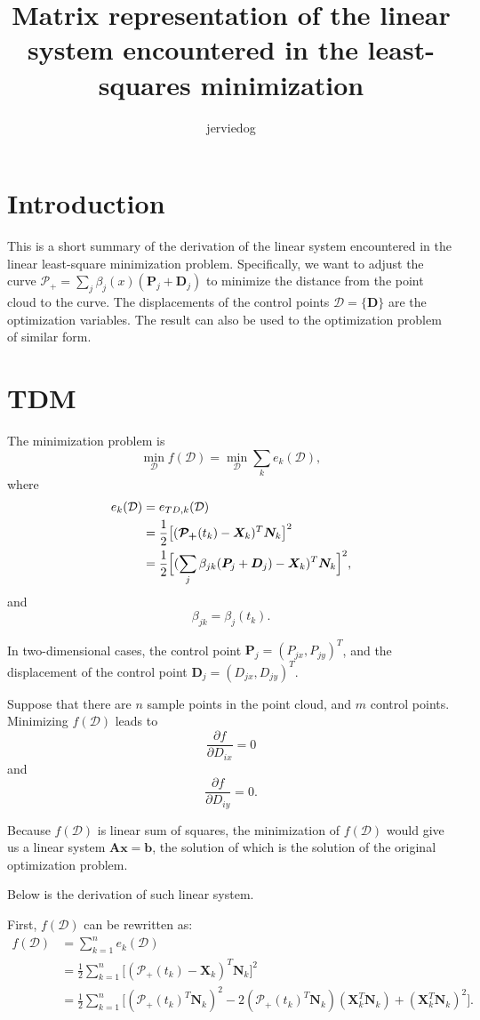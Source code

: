 \documentclass[11pt]{article}
\newcommand{\sd}{\mathcal{D}} %
\newcommand{\bmmpp}{\bm{\mathcal{P_+}}} %
\newcommand{\splinepk}{\sum_j{\beta_{jk}(\bm{P}_j+\bm{D}_j)}}
\newcommand{\splinepx}{\sum_j{\beta_j(x)(\bm{P}_j+\bm{D}_j)}}
\newcommand{\half}{\frac{1}{2}}
\newcommand{\vX}[1]{\bm{X}_{#1}} %
\newcommand{\vN}[1]{\bm{N}_{#1}} %
\newcommand{\bjtk}{\beta_j(t_k)}
\newcommand{\mA}{\mathbf{A}} %
\newcommand{\mx}{\mathbf{x}} %
\newcommand{\mb}{\mathbf{b}} %
\renewcommand{\b}[1]{\beta_{#1}}
\begin{document}
 
\title{Matrix representation of the linear system encountered in the least-squares minimization}
\author{jerviedog}
\maketitle

\section{Introduction}
This is a short summary of the derivation of the linear system encountered in the linear least-square minimization problem. Specifically, we want to adjust the curve $\bmmpp=\splinepx$ to minimize the distance from the point cloud to the curve. The displacements of the control points $\sd=\{\bm{D}\}$ are the optimization variables. The result can also be used to the optimization problem of similar form.

\section{TDM}
The minimization problem is \\
\[
\min_{\sd}{f(\sd)} = \min_{\sd}{\sum_k{e_k(\sd)}},
\]
where 
\[
\begin{split}
e_k(\sd) &= e_{TD,k}(\sd) \\
&= \half\big[(\bmmpp(t_k)-\vX{k})^T\vN{k}\big]^2 \\
&= \half\Bigl[(\splinepk-\vX{k})^T\vN{k}\Bigr]^2,
\end{split}
\]
and
\[
\b{jk}=\bjtk.
\]
 
In two-dimensional cases, the control point $\bm{P}_j = (P_{jx},P_{jy})^T$, and the displacement of the control point $\bm{D}_j = (D_{jx},D_{jy})^T$.

Suppose that there are $n$ sample points in the point cloud, and $m$ control points. Minimizing $f(\sd)$ leads to 
\[
\frac{\partial{f}}{\partial{D_{ix}}} = 0
\]
and
\[
\frac{\partial{f}}{\partial{D_{iy}}} = 0.
\]

Because $f(\sd)$ is linear sum of squares, the minimization of $f(\sd)$ would give us a linear system $\mA\mx=\mb$, the solution of which is the solution of the original optimization problem.

Below is the derivation of such linear system.

First, $f(\mathcal{D})$ can be rewritten as: 
\[
\begin{split}
f(\sd) &= \sum_{k=1}^n{e_k(\sd)} \\
&= \half\sum_{k=1}^n{\big[(\bmmpp(t_k)-\vX{k})^T\vN{k}\big]^2} \\
&= \half\sum_{k=1}^n{\big[(\bmmpp(t_k)^T\vN{k})^2-2(\bmmpp(t_k)^T\vN{k})(\vX{k}^T\vN{k})+(\vX{k}^T\vN{k})^2\big]}.
\end{split}
\]
\end{document}
